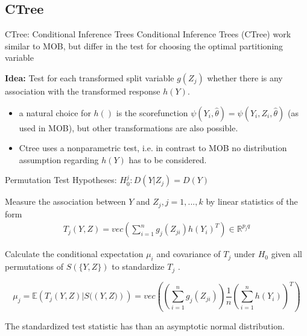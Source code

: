 \documentclass[9pt, xcolor=table]{beamer}
\begin{document}
\subsection{CTree}
\begin{frame}{CTree: Conditional Inference Trees}
Conditional Inference Trees (CTree) work similar to MOB, but differ in the test for choosing the optimal partitioning variable

\vspace{0.5cm}

\textbf{Idea:} Test for each transformed split variable  $g(Z_{j})$ whether there is any association with the transformed response $h(Y)$.\citep{Schlosser.24.06.2019} 

\begin{itemize}
    \item a natural choice for $h()$ is the scorefunction $\psi(Y_{i}, \hat{\theta}) = \psi(Y_{i}, Z_{i}, \hat{\theta})$ (as used in MOB), but other transformations are also possible.
    \item Ctree uses a nonparametric test, i.e. in contrast to MOB no distribution assumption regarding $h(Y)$ has to be considered.
\end{itemize}


\end{frame}

\begin{frame}{Permutation Test}
Hypotheses: $H_0^j: D(Y|Z_{j}) = D(Y)$

\vspace{0.5cm}

Measure the association between $Y$ and $Z_{j}, j = 1,...,k$ by linear statistics of the form 
\begin{align}
    T_{j}(Y,Z) = vec\left(\sum_{i=1}^n g_{j}(Z_{ji})h(Y_{i})^T\right) \in \mathbb{R}^{p_{j}q}
\end{align}
\citep{Hothorn.2006}

Calculate the conditional expectation $\mu_{i}$ and covariance of $T_{j}$ under $H_{0}$ given all permutations of $S(\{Y,Z\})$ to standardize $T_{j}$ .

$$ \mu_{j} = \mathbb{E}\left(T_{j}({Y,Z})|S(({Y,Z)})\right) = vec\left(\left(\sum_{i=1}^n g_{j}(Z_{ji})\right)\frac{1}{n}\left(\sum_{i=1}^n h(Y_{i})\right)^T\right) $$

The standardized test statistic has than an asymptotic normal distribution.

\citep{Schlosser.24.06.2019}
\end{frame}
\end{document}
